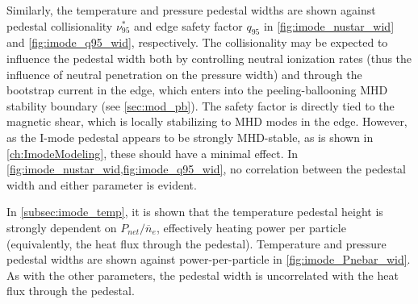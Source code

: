 Similarly, the temperature and pressure pedestal widths are shown against pedestal collisionality $\nu^*_{95}$ and edge safety factor $q_{95}$ in \cref{fig:imode_nustar_wid} and \cref{fig:imode_q95_wid}, respectively.  The collisionality may be expected to influence the pedestal width both by controlling neutral ionization rates (thus the influence of neutral penetration on the pressure width) and through the bootstrap current in the edge, which enters into the peeling-ballooning MHD stability boundary (see \cref{sec:mod_pb}).  The safety factor is directly tied to the magnetic shear, which is locally stabilizing to MHD modes in the edge.  However, as the I-mode pedestal appears to be strongly MHD-stable, as is shown in \cref{ch:ImodeModeling}, these should have a minimal effect.  In \cref{fig:imode_nustar_wid,fig:imode_q95_wid}, no correlation between the pedestal width and either parameter is evident.

In \cref{subsec:imode_temp}, it is shown that the temperature pedestal height is strongly dependent on $P_{net}/\overline{n}_e$, effectively heating power per particle (equivalently, the heat flux through the pedestal).  Temperature and pressure pedestal widths are shown against power-per-particle in \cref{fig:imode_Pnebar_wid}.  As with the other parameters, the pedestal width is uncorrelated with the heat flux through the pedestal.

\begin{figure}[t]
 \pushtooutside
\end{figure}

